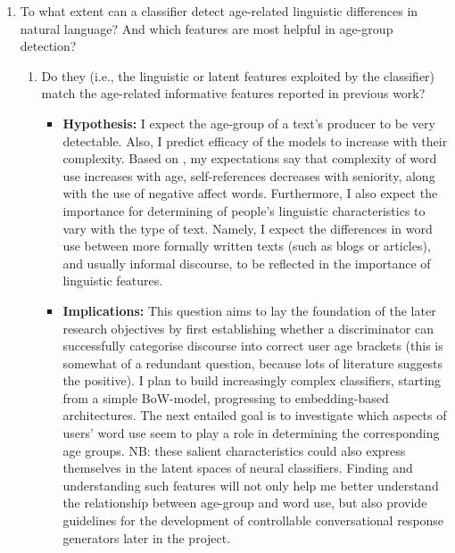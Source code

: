\begin{enumerate}
    \item To what extent can a classifier detect age-related linguistic differences in natural language? And which features are most helpful in age-group detection?
    \begin{enumerate}
        \item Do they (i.e., the linguistic or latent features exploited by the classifier) match the age-related informative features reported in previous work?
        \begin{itemize}
            \item \textbf{Hypothesis:} I expect the age-group of a text's producer to be very detectable. Also, I predict efficacy of the models to increase with their complexity. Based on \cite{pennebaker2003words}, my expectations say that complexity of word use increases with age, self-references decreases with seniority, along with the use of negative affect words. Furthermore, I also expect the importance for determining of people's linguistic characteristics to vary with the type of text. Namely, I expect the differences in word use between more formally written texts (such as blogs or articles), and usually informal discourse, to be reflected in the importance of linguistic features.
            \item \textbf{Implications:} This question aims to lay the foundation of the later research objectives by first establishing whether a discriminator can successfully categorise discourse into correct user age brackets (this is somewhat of a redundant question, because lots of literature suggests the positive). I plan to build increasingly complex classifiers, starting from a simple BoW-model, progressing to embedding-based architectures. The next entailed goal is to investigate which aspects of users' word use seem to play a role in determining the corresponding age groups. NB: these salient characteristics could also express themselves in the latent spaces of neural classifiers. Finding and understanding such features will not only help me better understand the relationship between age-group and word use, but also provide guidelines for the development of controllable conversational response generators later in the project.
        \end{itemize}
    \end{enumerate}
    

\end{enumerate}
